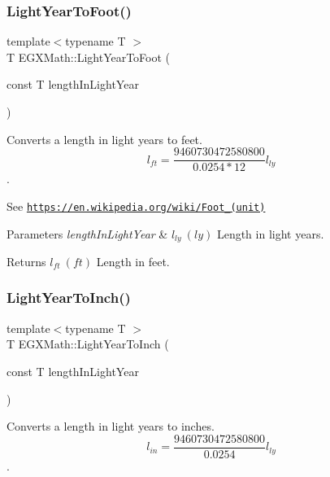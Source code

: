\subsubsection{\texorpdfstring{Light\+Year\+To\+Foot()}{LightYearToFoot()}}
{\footnotesize\ttfamily template$<$typename T $>$ \\
T E\+G\+X\+Math\+::\+Light\+Year\+To\+Foot (\begin{DoxyParamCaption}\item[{const T}]{length\+In\+Light\+Year }\end{DoxyParamCaption})}



Converts a length in light years to feet. \[ l_{ft}= \frac{9460730472580800}{0.0254 * 12} l_{ly} \]. 

See \href{https://en.wikipedia.org/wiki/Foot_(unit)}{\tt https\+://en.\+wikipedia.\+org/wiki/\+Foot\+\_\+(unit)} 
\begin{DoxyParams}{Parameters}
{\em length\+In\+Light\+Year} & $ l_{ly}\ (ly)$ Length in light years. \\
\hline
\end{DoxyParams}
\begin{DoxyReturn}{Returns}
$ l_{ft}\ (ft)$ Length in feet. 
\end{DoxyReturn}
\mbox{\label{group___e_g_x_math-_conversions-_length_conversions-_astronomical-_light_year-_imperial_gafb89ce302210990623906b463d6e50cb}} 
\subsubsection{\texorpdfstring{Light\+Year\+To\+Inch()}{LightYearToInch()}}
{\footnotesize\ttfamily template$<$typename T $>$ \\
T E\+G\+X\+Math\+::\+Light\+Year\+To\+Inch (\begin{DoxyParamCaption}\item[{const T}]{length\+In\+Light\+Year }\end{DoxyParamCaption})}



Converts a length in light years to inches. \[ l_{in}= \frac{9460730472580800}{0.0254} l_{ly} \]. 

